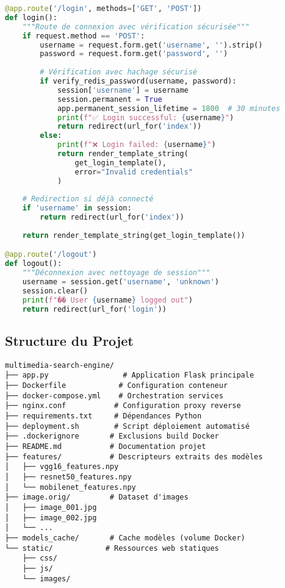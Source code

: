 \documentclass[12pt,a4paper]{article}
\begin{document}
\begin{lstlisting}[language=Python, caption=Fonctions de sécurité]
@app.route('/login', methods=['GET', 'POST'])
def login():
    """Route de connexion avec vérification sécurisée"""
    if request.method == 'POST':
        username = request.form.get('username', '').strip()
        password = request.form.get('password', '')
        
        # Vérification avec hachage sécurisé
        if verify_redis_password(username, password):
            session['username'] = username
            session.permanent = True
            app.permanent_session_lifetime = 1800  # 30 minutes
            print(f"✅ Login successful: {username}")
            return redirect(url_for('index'))
        else:
            print(f"❌ Login failed: {username}")
            return render_template_string(
                get_login_template(), 
                error="Invalid credentials"
            )
    
    # Redirection si déjà connecté
    if 'username' in session:
        return redirect(url_for('index'))
    
    return render_template_string(get_login_template())

@app.route('/logout')
def logout():
    """Déconnexion avec nettoyage de session"""
    username = session.get('username', 'unknown')
    session.clear()
    print(f"�� User {username} logged out")
    return redirect(url_for('login'))
\end{lstlisting}

\subsection{Structure du Projet}

\begin{lstlisting}[caption=Arborescence complète du projet]
multimedia-search-engine/
├── app.py                 # Application Flask principale
├── Dockerfile            # Configuration conteneur
├── docker-compose.yml    # Orchestration services
├── nginx.conf           # Configuration proxy reverse
├── requirements.txt     # Dépendances Python
├── deployment.sh        # Script déploiement automatisé
├── .dockerignore       # Exclusions build Docker
├── README.md           # Documentation projet
├── features/           # Descripteurs extraits des modèles
│   ├── vgg16_features.npy
│   ├── resnet50_features.npy
│   └── mobilenet_features.npy
├── image.orig/         # Dataset d'images
│   ├── image_001.jpg
│   ├── image_002.jpg
│   └── ...
├── models_cache/       # Cache modèles (volume Docker)
└── static/            # Ressources web statiques
    ├── css/
    ├── js/
    └── images/
\end{lstlisting}
\end{document}
